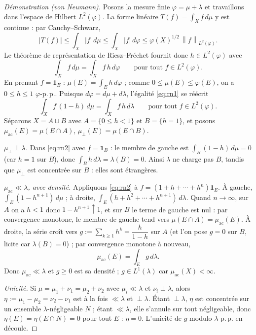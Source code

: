 \documentclass[11pt]{article}
\theoremstyle{thmblue}
\theoremstyle{defplain}
\theoremstyle{rem}
\newcommand{\pp}{p.\,p.}
\newcommand{\abs}[1]{\left\lvert #1 \right\rvert}
\newcommand{\norm}[1]{\left\lVert #1 \right\rVert}
\begin{document}
\begin{proof}[Démonstration (von Neumann)]
Posons la mesure finie $\varphi=\mu+\lambda$ et travaillons dans l'espace de Hilbert $L^2(\varphi)$.
La forme linéaire $T(f)=\int_X f\,d\mu$ y est continue : par Cauchy--Schwarz,
\[
\abs{T(f)}\le\int_X\abs f\,d\mu\le\int_X\abs f\,d\varphi\le\varphi(X)^{1/2}\,\norm{f}_{L^2(\varphi)}.
\]
Le théorème de représentation de Riesz--Fréchet fournit donc $h\in L^2(\varphi)$ avec
\begin{equation}\label{eq:rn1}
\int_X f\,d\mu=\int_X f\,h\,d\varphi\qquad\text{pour tout }f\in L^2(\varphi).
\end{equation}
En prenant $f=\mathbf 1_E$ : $\mu(E)=\int_E h\,d\varphi$ ; comme $0\le\mu(E)\le\varphi(E)$, on a
$0\le h\le1$ $\varphi$-\pp. Puisque $d\varphi=d\mu+d\lambda$, l'égalité \eqref{eq:rn1} se réécrit
\begin{equation}\label{eq:rn2}
\int_X f\,(1-h)\,d\mu=\int_X f\,h\,d\lambda\qquad\text{pour tout }f\in L^2(\varphi).
\end{equation}
Séparons $X=A\sqcup B$ avec $A=\{0\le h<1\}$ et $B=\{h=1\}$, et posons
$\mu_{\mathrm{ac}}(E)=\mu(E\cap A)$, $\mu_{\perp}(E)=\mu(E\cap B)$.

\emph{$\mu_{\perp}\perp\lambda$.} Dans \eqref{eq:rn2} avec $f=\mathbf 1_B$ : le membre de gauche est
$\int_B(1-h)\,d\mu=0$ (car $h=1$ sur $B$), donc $\int_B h\,d\lambda=\lambda(B)=0$. Ainsi $\lambda$ ne
charge pas $B$, tandis que $\mu_{\perp}$ est concentrée sur $B$ : elles sont étrangères.

\emph{$\mu_{\mathrm{ac}}\ll\lambda$, avec densité.} Appliquons \eqref{eq:rn2} à
$f=(1+h+\cdots+h^n)\mathbf 1_E$. À gauche, $\int_E(1-h^{n+1})\,d\mu$ ; à droite,
$\int_E(h+h^2+\cdots+h^{n+1})\,d\lambda$. Quand $n\to\infty$, sur $A$ on a $h<1$ donc
$1-h^{n+1}\uparrow1$, et sur $B$ le terme de gauche est nul : par convergence monotone, le membre de
gauche tend vers $\mu(E\cap A)=\mu_{\mathrm{ac}}(E)$. À droite, la série croît vers
$g:=\sum_{k\ge1}h^k=\dfrac{h}{1-h}$ sur $A$ (et l'on pose $g=0$ sur $B$, licite car $\lambda(B)=0$) ;
par convergence monotone à nouveau,
\[
\mu_{\mathrm{ac}}(E)=\int_E g\,d\lambda.
\]
Donc $\mu_{\mathrm{ac}}\ll\lambda$ et $g\ge0$ est sa densité ; $g\in L^1(\lambda)$ car
$\mu_{\mathrm{ac}}(X)<\infty$.

\emph{Unicité.} Si $\mu=\mu_1+\nu_1=\mu_2+\nu_2$ avec $\mu_i\ll\lambda$ et $\nu_i\perp\lambda$, alors
$\eta:=\mu_1-\mu_2=\nu_2-\nu_1$ est à la fois $\ll\lambda$ et $\perp\lambda$. Étant $\perp\lambda$,
$\eta$ est concentrée sur un ensemble $\lambda$-négligeable $N$ ; étant $\ll\lambda$, elle s'annule sur
tout négligeable, donc $\eta(E)=\eta(E\cap N)=0$ pour tout $E$ : $\eta=0$. L'unicité de $g$ modulo
$\lambda$-\pp{} en découle.
\end{proof}
\end{document}
